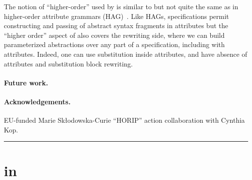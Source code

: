 \documentclass[letterpaper,11pt]{article}
\begin{document}
The notion of ``higher-order'' used by \hax is similar to but not quite the same as in higher-order
attribute grammars (HAG)~\cite{VogtSwierstraKuiper:pldi1989}. Like HAGs, \hax specifications permit
constructing and passing of abstract syntax fragments in attributes but the ``higher order'' aspect
of \hax also covers the rewriting side, where we can build parameterized abstractions over any part
of a specification, including with attributes. Indeed, one can use substitution inside attributes,
and have absence of attributes and substitution block rewriting.

\paragraph*{Future work.} 


\paragraph*{Acknowledgements.} 

EU-funded Marie Skłodowska-Curie ``HORIP'' action collaboration with Cynthia Kop.






\hrule
\vspace*{1pc}

\appendix

\section{\bhax in \HAX}
\end{document}
